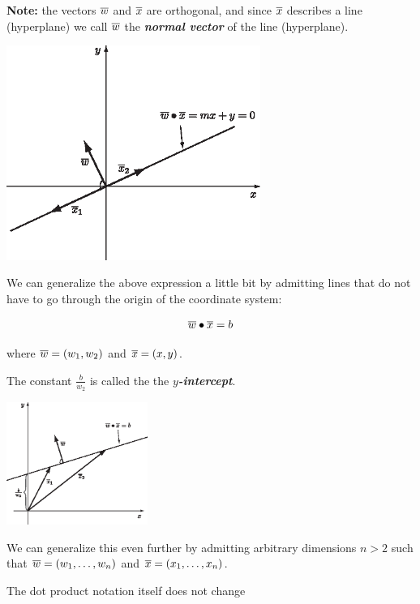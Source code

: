 \documentclass[a4paper,blends,pdf,colorBG,slideColor]{prosper}
\begin{document}
{\bf Note:} the vectors $\overline{w}$ and $\overline{x}$ are orthogonal, and since $\overline{x}$ describes
a line (hyperplane) we call $\overline{w}$ the {\bf\em normal vector} of the line (hyperplane).
\es
{}
\begin{center}
\includegraphics[height=70mm]{figures/fig03-07.eps}
\end{center}
\es

We can generalize the above expression a little bit by admitting lines that do not
have to go through the origin of the coordinate system:

\[
\overline{w}\bullet\overline{x} = b
\]

 where $\overline{w} = (w_1, w_2)$ and $\overline{x} = (x,y)$.  
 
 The constant $\frac{b}{w_2}$ is called the the {\bf\em $y$-intercept}.
 
 \begin{center}
 \includegraphics[height=40mm]{figures/fig03-08.eps}
 \end{center}
 \es

We can generalize this even further by admitting arbitrary dimensions $n > 2$ such that
$\overline{w} = (w_1,\ldots,w_n)$ and
$\overline{x} = (x_1,\ldots,x_n)$.

The dot product notation itself does not change
\begin{center}
\end{center}
\end{document}
